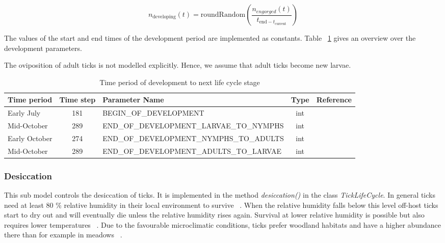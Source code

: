 \documentclass[a4paper, 11pt]{scrartcl}
\begin{document}
\begin{equation}
n_{\text{developing}}(t) = \text{roundRandom}(\frac{n_{engorged}(t)}{t_{\text{end} - t_{\text{current}}}})
\end{equation}

The values of the start and end times of the development period are implemented as constants. Table ~\ref{tab:development_parameters} gives an overview over the development parameters.

The oviposition of adult ticks is not modelled explicitly. Hence, we assume that adult ticks become new larvae.

\begin{table}[h!]
\caption{Time period of development to next life cycle stage}
\label{tab:development_parameters}
\begin{tabularx}{\textwidth}{lclcl}
\toprule
\textbf{Time period} 	& \textbf{Time step} & \textbf{Parameter Name}							& \textbf{Type}    & \textbf{Reference} \\
\midrule
Early July   			& 181   			 & \tiny{BEGIN\_OF\_DEVELOPMENT}					& int      & ~\cite{tba}   		\\
Mid-October     		& 289      			 & \tiny{END\_OF\_DEVELOPMENT\_LARVAE\_TO\_NYMPHS}	& int      & ~\cite{tba}      	\\
Early October    		& 274    			 & \tiny{END\_OF\_DEVELOPMENT\_NYMPHS\_TO\_ADULTS}	& int      & ~\cite{tba}     	\\
Mid-October     		& 289      			 & \tiny{END\_OF\_DEVELOPMENT\_ADULTS\_TO\_LARVAE}	& int      & ~\cite{tba}        \\
\bottomrule
\end{tabularx}
\end{table}

\subsubsection{Desiccation}
This sub model controls the desiccation of ticks. It is implemented in the method \textit{desiccation()} in the class \textit{TickLifeCycle}. In general ticks need at least 80 \% relative humidity in their local environment to survive ~\parencite{Medlock.2013, Gray.2016, Hauser.2018}. When the relative humidity falls below this level off-host ticks start to dry out and will eventually die unless the relative humidity rises again. Survival at lower relative humidity is possible but also requires lower temperatures ~\parencite{Ostfeld.2015}. Due to the favourable microclimatic conditions, ticks prefer woodland habitats and have a higher abundance there than for example in meadows ~\parencite{Lindstrom.2003, Boehnke.2015}.
\end{document}
